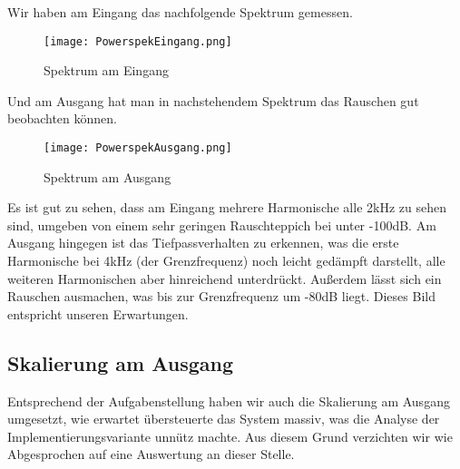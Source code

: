 Wir haben am Eingang das nachfolgende Spektrum gemessen.
\begin{figure}[H]
  \centering
    \texttt{[image: PowerspekEingang.png]}
  \caption{Spektrum am Eingang}
  \label{fig:PowerspekEingang}
\end{figure}
Und am Ausgang hat man in nachstehendem Spektrum das Rauschen gut beobachten können.
\begin{figure}[H]
  \centering
    \texttt{[image: PowerspekAusgang.png]}
  \caption{Spektrum am Ausgang}
  \label{fig:PowerspekAusgang}
\end{figure}
Es ist gut zu sehen, dass am Eingang mehrere Harmonische alle 2kHz zu sehen sind, umgeben von einem sehr geringen Rauschteppich bei unter -100dB. Am Ausgang hingegen ist das Tiefpassverhalten zu erkennen, was die erste Harmonische bei 4kHz (der Grenzfrequenz) noch leicht gedämpft darstellt, alle weiteren Harmonischen aber hinreichend unterdrückt. Außerdem lässt sich ein Rauschen ausmachen, was bis zur Grenzfrequenz um -80dB liegt. Dieses Bild entspricht unseren Erwartungen.
\subsection{Skalierung am Ausgang}
Entsprechend der Aufgabenstellung haben wir auch die Skalierung am Ausgang umgesetzt, wie erwartet übersteuerte das System massiv, was die Analyse der Implementierungsvariante unnütz machte. Aus diesem Grund verzichten wir wie Abgesprochen auf eine Auswertung an dieser Stelle.
